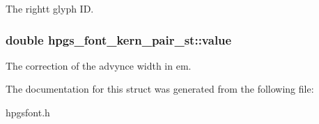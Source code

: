 The rightt glyph ID. 
\subsubsection[value]{\setlength{\rightskip}{0pt plus 5cm}double {\bf hpgs\_\-font\_\-kern\_\-pair\_\-st::value}}\label{structhpgs__font__kern__pair__st_29b9815a791a3ee31a208cd4c84810ac}


The correction of the advynce width in em. 

The documentation for this struct was generated from the following file:\begin{CompactItemize}
\item 
hpgsfont.h\end{CompactItemize}
